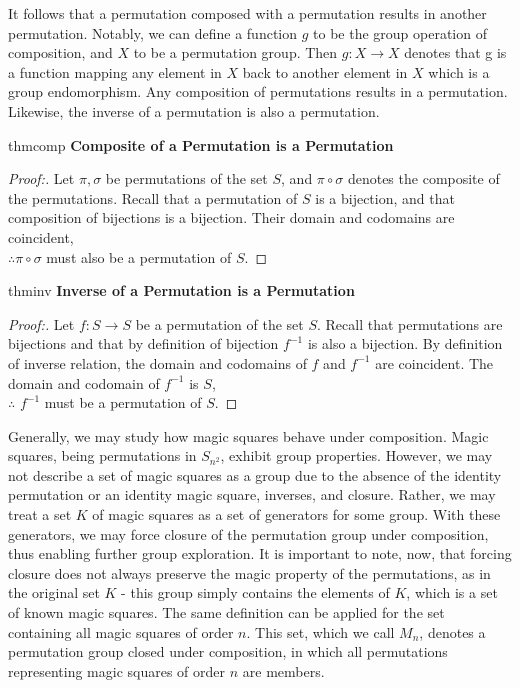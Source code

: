 \documentclass[12pt]{report}
\begin{document}
\par It follows that a permutation composed with a permutation results in another permutation.
Notably, we can define a function $g$ to be the group operation of composition, and $X$ to be a
permutation group. Then $g:X\rightarrow X$ denotes that g is a function mapping any element in $X$
back to another element in $X$ which is a group endomorphism. Any composition of permutations
results in a permutation. Likewise, the inverse of a permutation is also a permutation.

\singlespacing{}
\begin{thmbox}{}{thmcomp}
  \textbf{Composite of a Permutation is a Permutation}
  \begin{proof}[Proof:]
    Let $\pi,\sigma$ be permutations of the set $S$, and $\pi\circ\sigma$ denotes the composite of
    the permutations. Recall that a permutation of $S$ is a bijection, and that composition of
    bijections is a bijection. Their domain and codomains are coincident,\\ $\therefore
      \pi\circ\sigma$
    must also be a permutation of $S$.
  \end{proof}
\end{thmbox}
\doublespacing{}

\singlespacing{}
\begin{thmbox}{}{thminv}
  \textbf{Inverse of a Permutation is a Permutation}
  \begin{proof}[Proof:]
    Let $f : S \rightarrow S$ be a permutation of the set $S$. Recall that permutations are
    bijections and that by definition of bijection $f^{-1}$ is also a bijection. By definition of
    inverse relation, the domain and codomains of $f$ and $f^{-1}$ are coincident. The domain and
    codomain of $f^{-1}$ is $S$,\\ $\therefore$ $f^{-1}$ must be a permutation of $S$.
  \end{proof}
\end{thmbox}
\doublespacing{}

\par Generally, we may study how magic squares behave under composition. Magic squares, being
permutations in $S_{n^2}$, exhibit group properties. However, we may not describe a set of magic
squares as a group due to the absence of the identity permutation or an identity magic square,
inverses, and closure. Rather, we may treat a set $K$ of magic squares as a set of generators for
some group. With these generators, we may force closure of the permutation group under composition,
thus enabling further group exploration. It is important to note, now, that forcing closure does
not always preserve the magic property of the permutations, as in the original set $K$ \hyphen{}
this group simply contains the elements of $K$, which is a set of known magic squares. The same
definition can be applied for the set containing all magic squares of order $n$. This set, which we
call $M_n$, denotes a permutation group closed under composition, in which all permutations
representing magic squares of order $n$ are members.
\end{document}
